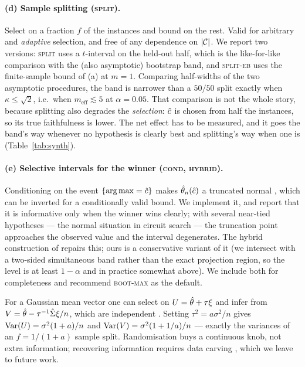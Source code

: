 \paragraph{(d) Sample splitting (\textsc{split}).}
Select on a fraction $f$ of the instances and bound on the rest. Valid for
arbitrary and \emph{adaptive} selection, and free of any dependence on
$|\mathcal{C}|$. We report two versions: \textsc{split} uses a $t$-interval on the
held-out half, which is the like-for-like comparison with the (also asymptotic)
bootstrap band, and \textsc{split-eb} uses the finite-sample bound of (a) at
$m=1$. Comparing half-widths of the two asymptotic procedures, the band is narrower than
a $50/50$ split exactly when $\kappa\le\sqrt 2$, i.e.\ when
$m_{\mathrm{eff}}\lesssim 5$ at $\alpha=0.05$. That comparison is not the whole
story, because splitting also degrades the \emph{selection}: $\hat{c}$ is chosen
from half the instances, so its true faithfulness is lower. The net effect has to
be measured, and it goes the band's way whenever no hypothesis is clearly best
and splitting's way when one is (Table~\ref{tab:synth}).

\paragraph{(e) Selective intervals for the winner (\textsc{cond}, \textsc{hybrid}).}
Conditioning on the event $\{\operatorname*{arg\,max}=\hat{c}\}$ makes $\hat{\theta}_n(\hat{c})$ a
truncated normal \citep{lee2016exact,andrews2024inference}, which can be inverted
for a conditionally valid bound. We implement it, and report that it is
informative only when the winner wins clearly; with several near-tied hypotheses
--- the normal situation in circuit search --- the truncation point approaches
the observed value and the interval degenerates. The hybrid construction of \citet{andrews2024inference} repairs this; ours is a
conservative variant of it (we intersect with a two-sided simultaneous band
rather than the exact projection region, so the level is at least $1-\alpha$ and
in practice somewhat above). We include both for completeness and recommend
\textsc{boot-max} as the default.

\begin{remark}
For a Gaussian mean vector one can select on $U=\hat{\theta}+\tau\xi$ and infer from
$V=\hat{\theta}-\tau^{-1}\hat\Sigma\xi/n$, which are independent
\citep{leiner2025fission,garciarasines2023splitting}. Setting
$\tau^2=a\sigma^2/n$ gives $\operatorname{Var}(U)=\sigma^2(1+a)/n$ and
$\operatorname{Var}(V)=\sigma^2(1+1/a)/n$ --- exactly the variances of an $f=1/(1+a)$ sample
split. Randomisation buys a continuous knob, not extra information; recovering
information requires data carving \citep{fithian2014optimal}, which we leave to
future work.
\end{remark}


